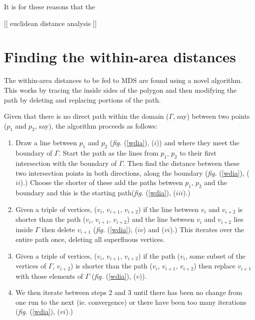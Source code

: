 \documentclass[a4paper,10pt]{amsart}
\newcommand{\fig}[1]{\emph{fig.} (\ref{#1})}
\begin{document}
It is for these reasons that the 




[[ euclidean distance analysis ]]


\section{Finding the within-area distances}

The within-area distances to be fed to MDS are found using a novel algorithm. This works by tracing the inside sides of the polygon and then modifying the path by deleting and replacing portions of the path. 

Given that there is no direct path within the domain ($\Gamma$, say) between two points ($p_1$ and $p_2$, say), the algorithm proceeds as follows:

\begin{enumerate}
\item Draw a line between $p_1$ and $p_2$ (\fig{wdia}, ($i$)) and where they meet the boundary of $\Gamma$. Start the path as the lines from $p_1$, $p_2$ to their first intersection with the boundary of $\Gamma$. Then find the distance between these two intersection points in both directions, along the boundary (\fig{wdia}, ($ii$).) Choose the shorter of these add the paths between $p_1$, $p_2$ and the boundary and this is the starting path(\fig{wdia}, ($iii$).) 
\item Given a triple of vertices, ($v_i$, $v_{i+1}$, $v_{i+2}$) if the line between $v_i$ and $v_{i+2}$ is shorter than the path ($v_i$, $v_{i+1}$, $v_{i+2}$) and the line between $v_i$ and $v_{i+2}$ lies inside $\Gamma$ then delete $v_{i+1}$ (\fig{wdia}, ($iv$) and ($vi$).) This iterates over the entire path once, deleting all superfluous vertices. 
\item Given a triple of vertices, ($v_i$, $v_{i+1}$, $v_{i+2}$) if the path ($v_i$, some subset of the vertices of $\Gamma$, $v_{i+2}$) is shorter than the path ($v_i$, $v_{i+1}$, $v_{i+2}$) then replace $v_{i+1}$ with those elements of $\Gamma$ (\fig{wdia}, ($v$)). 
\item We then iterate between steps 2 and 3 until there has been no change from one run to the next (ie. convergence) or there have been too many iterations (\fig{wdia}, ($vi$).)
\end{enumerate}
\end{document}
